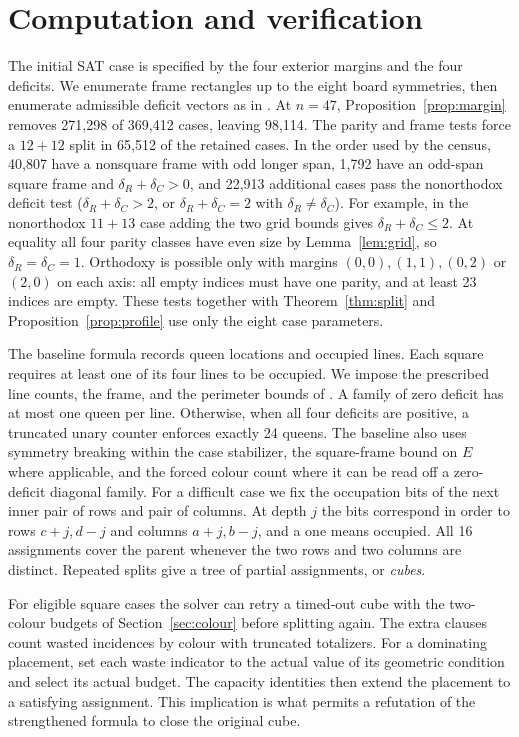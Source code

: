 \documentclass[11pt]{article}
\begin{document}
\section{Computation and verification}
The initial SAT case is specified by the four exterior margins and the
four deficits. We enumerate frame rectangles up to the eight board
symmetries, then enumerate admissible deficit vectors as in \cite{Davies}.
At $n=47$, Proposition~\ref{prop:margin} removes 271,298 of 369,412 cases,
leaving 98,114. The parity and frame tests force a $12+12$ split in
65,512 of the retained cases. In the order used by the census, 40,807
have a nonsquare frame with odd longer span, 1,792 have an odd-span
square frame and $\delta_R+\delta_C>0$, and 22,913 additional cases
pass the nonorthodox deficit test ($\delta_R+\delta_C>2$, or $\delta_R+\delta_C=2$
with $\delta_R\ne\delta_C$). For example, in the nonorthodox $11+13$
case adding the two grid bounds gives $\delta_R+\delta_C\le2$. At
equality all four parity classes have even size by Lemma~\ref{lem:grid},
so $\delta_R=\delta_C=1$. Orthodoxy is possible only with margins
$(0,0),(1,1),(0,2)$ or $(2,0)$ on each axis: all empty indices must
have one parity, and at least 23 indices are empty. These tests together
with Theorem~\ref{thm:split} and Proposition~\ref{prop:profile} use only
the eight case parameters.

The baseline formula records queen locations and occupied lines. Each
square requires at least one of its four lines to be occupied. We impose
the prescribed line counts, the frame, and the perimeter bounds of
\cite{Davies}. A family of zero deficit has at most one queen per line.
Otherwise, when all four deficits are positive, a truncated unary counter
enforces exactly 24 queens. The baseline also uses symmetry breaking within
the case stabilizer, the square-frame bound on $E$ where applicable, and
the forced colour count where it can be read off a zero-deficit diagonal
family. For a difficult case we fix the occupation bits of the next inner
pair of rows and pair of columns. At depth $j$ the bits correspond in
order to rows $c+j,d-j$ and columns $a+j,b-j$, and a one means occupied.
All 16 assignments cover the parent whenever the two rows and two columns
are distinct.
Repeated splits give a tree of partial assignments, or \emph{cubes}.

For eligible square cases the solver can retry a timed-out cube with
the two-colour budgets of Section~\ref{sec:colour} before splitting
again. The extra clauses count wasted incidences by colour with truncated
totalizers. For a dominating placement, set each waste indicator to the
actual value of its geometric condition and select its actual budget.
The capacity identities then extend the placement to a satisfying
assignment. This implication is what permits a refutation of the
strengthened formula to close the original cube.
\end{document}
